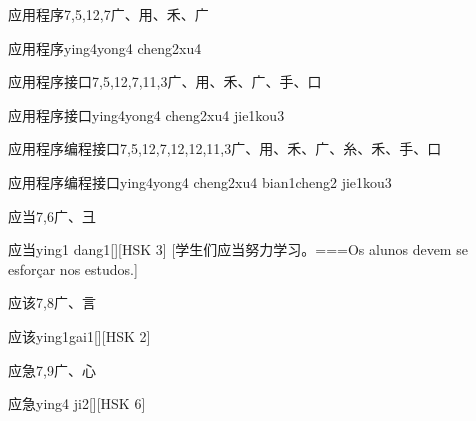 \begin{Entry}{应用程序}{7,5,12,7}{⼴、⽤、⽲、⼴}
  \begin{Phonetics}{应用程序}{ying4yong4 cheng2xu4}
  \end{Phonetics}
\end{Entry}

\begin{Entry}{应用程序接口}{7,5,12,7,11,3}{⼴、⽤、⽲、⼴、⼿、⼝}
  \begin{Phonetics}{应用程序接口}{ying4yong4 cheng2xu4 jie1kou3}
  \end{Phonetics}
\end{Entry}

\begin{Entry*}{应用程序编程接口}{7,5,12,7,12,12,11,3}{⼴、⽤、⽲、⼴、⽷、⽲、⼿、⼝}
  \begin{Phonetics}{应用程序编程接口}{ying4yong4 cheng2xu4 bian1cheng2 jie1kou3}
  \end{Phonetics}
\end{Entry*}

\begin{Entry}{应当}{7,6}{⼴、⼹}
  \begin{Phonetics}{应当}{ying1 dang1}[][HSK 3]
    [学生们应当努力学习。===Os alunos devem se esforçar nos estudos.]
  \end{Phonetics}
\end{Entry}

\begin{Entry}{应该}{7,8}{⼴、⾔}
  \begin{Phonetics}{应该}{ying1gai1}[][HSK 2]
  \end{Phonetics}
\end{Entry}

\begin{Entry}{应急}{7,9}{⼴、⼼}
  \begin{Phonetics}{应急}{ying4 ji2}[][HSK 6]
  \end{Phonetics}
\end{Entry}

